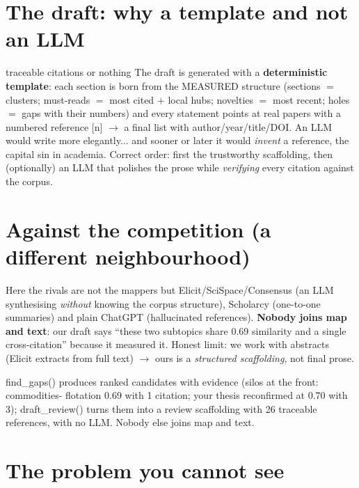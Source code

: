 \documentclass[11pt,a4paper]{article}
\begin{document}
\section{The draft: why a template and not an LLM}

\begin{concepto}{traceable citations or nothing}
The draft is generated with a \textbf{deterministic template}: each section is born from the
MEASURED structure (sections $=$ clusters; must-reads $=$ most cited $+$ local hubs; novelties
$=$ most recent; holes $=$ gaps with their numbers) and every statement points at real papers
with a numbered reference [n] $\rightarrow$ a final list with author/year/title/DOI. An LLM
would write more elegantly... and sooner or later it would \emph{invent} a reference, the
capital sin in academia. Correct order: first the trustworthy scaffolding, then (optionally) an
LLM that polishes the prose while \emph{verifying} every citation against the corpus.
\end{concepto}

\section{Against the competition (a different neighbourhood)}

Here the rivals are not the mappers but Elicit/SciSpace/Consensus (an LLM synthesising
\emph{without} knowing the corpus structure), Scholarcy (one-to-one summaries) and plain
ChatGPT (hallucinated references). \textbf{Nobody joins map and text}: our draft says ``these
two subtopics share 0.69 similarity and a single cross-citation'' because it measured it.
Honest limit: we work with abstracts (Elicit extracts from full text) $\rightarrow$ ours is a
\emph{structured scaffolding}, not final prose.

\begin{resumen}
find\_gaps() produces ranked candidates with evidence (silos at the front: commodities-
flotation 0.69 with 1 citation; your thesis reconfirmed at 0.70 with 3); draft\_review() turns
them into a review scaffolding with 26 traceable references, with no LLM. Nobody else joins
map and text.
\end{resumen}
\clearpage
{}
{}

\section{The problem you cannot see}
\end{document}
